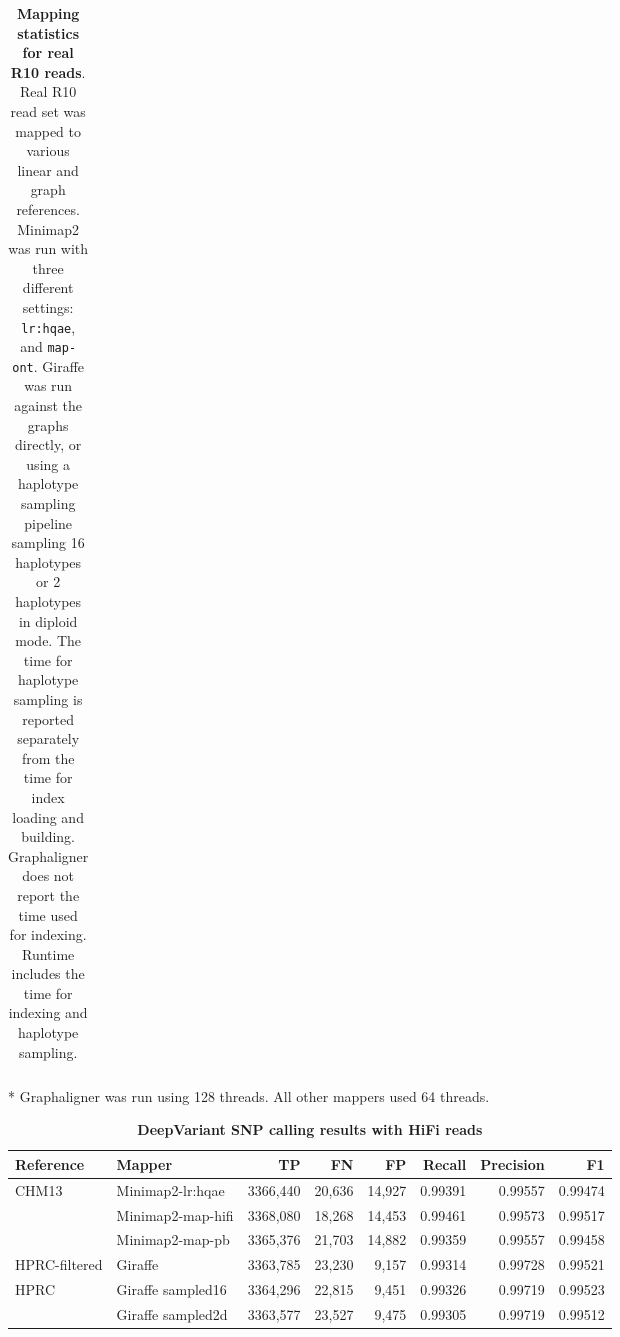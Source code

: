 \documentclass[11pt]{ucscthesis}
\begin{document}
\begin{landscape}
\begin{table}[htb]
\begin{threeparttable}
\begin{tabular}{|l|l|r|r|r|r|r|}
    
    \hline
    \end{tabular}
    \begin{tablenotes}
        \item [*] Graphaligner was run using 128 threads. All other mappers used 64 threads.
    \end{tablenotes}
    \end{threeparttable}
    \caption[R10 real read stats]{\textbf{Mapping statistics for real R10 reads}. Real R10 read set was mapped to various linear and graph references. Minimap2 was run with three different settings: \texttt{lr:hqae}, and \texttt{map-ont}. Giraffe was run against the graphs directly, or using a haplotype sampling pipeline sampling 16 haplotypes or 2 haplotypes in diploid mode. The time for haplotype sampling is reported separately from the time for index loading and building. Graphaligner does not report the time used for indexing. Runtime includes the time for indexing and haplotype sampling.}
    \label{tab:sup-r10-real}
    
\end{table}

\begin{table}[htb]
    \centering
    \begin{tabular}{|l|l|r|r|r|r|r|r|}
        \hline
        Reference         & Mapper               & TP          & FN          & FP         & Recall      & Precision   & F1 \\
        \hline
        CHM13             & Minimap2-lr:hqae     & 3366,440     & 20,636     & 14,927     & 0.99391     & 0.99557     & 0.99474 \\
                          & Minimap2-map-hifi    & 3368,080     & 18,268     & 14,453     & 0.99461     & 0.99573     & 0.99517 \\
                          & Minimap2-map-pb      & 3365,376     & 21,703     & 14,882     & 0.99359     & 0.99557     & 0.99458 \\
        HPRC-filtered     & Giraffe              & 3363,785     & 23,230     & 9,157      & 0.99314     & 0.99728     & 0.99521 \\
        HPRC              & Giraffe sampled16    & 3364,296     & 22,815     & 9,451      & 0.99326     & 0.99719     & 0.99523 \\
                          & Giraffe sampled2d    & 3363,577     & 23,527     & 9,475      & 0.99305     & 0.99719     & 0.99512 \\
        \hline
    \end{tabular}
    \caption[DeepVariant SNP HiFi results]{\textbf{DeepVariant SNP calling results with HiFi reads}}
    \label{tab:dv_snp_hifi}
\end{table}



\end{landscape}
\end{document}
